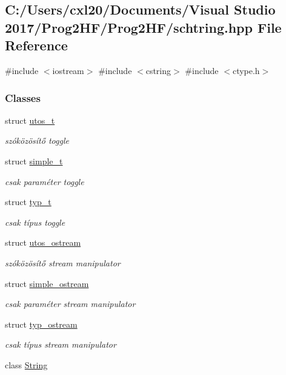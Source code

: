 \subsection{C\+:/\+Users/cxl20/\+Documents/\+Visual Studio 2017/\+Prog2\+H\+F/\+Prog2\+H\+F/schtring.hpp File Reference}
\label{schtring_8hpp}
{\ttfamily \#include $<$iostream$>$}\newline
{\ttfamily \#include $<$cstring$>$}\newline
{\ttfamily \#include $<$ctype.\+h$>$}\newline
\subsubsection*{Classes}
\begin{DoxyCompactItemize}
\item 
struct \mbox{\hyperlink{structutos__t}{utos\+\_\+t}}
\begin{DoxyCompactList}\small\item\em szóközösítő toggle \end{DoxyCompactList}\item 
struct \mbox{\hyperlink{structsimple__t}{simple\+\_\+t}}
\begin{DoxyCompactList}\small\item\em csak paraméter toggle \end{DoxyCompactList}\item 
struct \mbox{\hyperlink{structtyp__t}{typ\+\_\+t}}
\begin{DoxyCompactList}\small\item\em csak típus toggle \end{DoxyCompactList}\item 
struct \mbox{\hyperlink{structutos__ostream}{utos\+\_\+ostream}}
\begin{DoxyCompactList}\small\item\em szóközösítő stream manipulator \end{DoxyCompactList}\item 
struct \mbox{\hyperlink{structsimple__ostream}{simple\+\_\+ostream}}
\begin{DoxyCompactList}\small\item\em csak paraméter stream manipulator \end{DoxyCompactList}\item 
struct \mbox{\hyperlink{structtyp__ostream}{typ\+\_\+ostream}}
\begin{DoxyCompactList}\small\item\em csak típus stream manipulator \end{DoxyCompactList}\item 
class \mbox{\hyperlink{class_string}{String}}
\end{DoxyCompactItemize}
